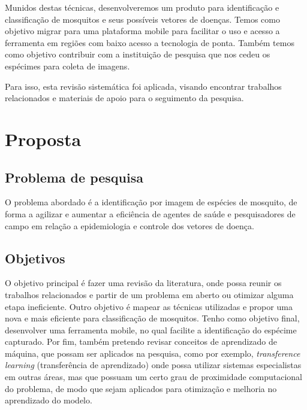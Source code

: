\documentclass[conference]{IEEEtran}
\begin{document}
Munidos destas técnicas, desenvolveremos um produto para identificação e classificação de mosquitos e seus possíveis vetores de doenças. Temos como objetivo migrar para uma plataforma mobile para facilitar o uso e acesso a ferramenta em regiões com baixo acesso a tecnologia de ponta. Também temos como objetivo contribuir com a instituição de pesquisa que nos cedeu os espécimes para coleta de imagens.

Para isso, esta revisão sistemática foi aplicada, visando encontrar trabalhos relacionados e materiais de apoio para o seguimento da pesquisa.


\section{Proposta} 
\subsection{Problema de pesquisa}
O problema abordado é a identificação por imagem de espécies de mosquito, de forma a agilizar e aumentar a eficiência de agentes de saúde e pesquisadores de campo em relação a epidemiologia e controle dos vetores de doença.

\subsection{Objetivos}
O objetivo principal é fazer uma revisão da literatura, onde possa reunir os trabalhos relacionados e partir de um problema em aberto ou otimizar alguma etapa ineficiente.
Outro objetivo é mapear as técnicas utilizadas e propor uma nova e mais eficiente para classificação de mosquitos. Tenho como objetivo final, desenvolver uma ferramenta mobile, no qual facilite a identificação do espécime capturado.
Por fim, também pretendo revisar conceitos de aprendizado de máquina, que possam ser aplicados na pesquisa, como por exemplo, \emph{transference learning} (transferência de aprendizado) onde possa utilizar sistemas especialistas em outras áreas, mas que possuam um certo grau de proximidade computacional do problema, de modo que sejam aplicados para otimização e melhoria no aprendizado do modelo.
\end{document}
